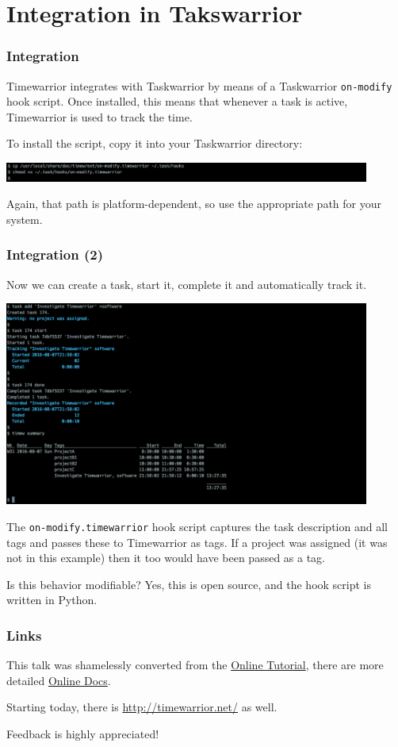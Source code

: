 \documentclass[t,handout]{beamer}
\begin{document}
\section{Integration in Takswarrior}

\begin{frame}[fragile]\frametitle{Integration}
    \vfill
    Timewarrior integrates with Taskwarrior by means of a Taskwarrior \verb=on-modify= hook script. Once installed, this means that whenever a task is active, Timewarrior is used to track the time.

    To install the script, copy it into your Taskwarrior directory:

    \includegraphics[width=12cm]{images/tutorial49.png}

    Again, that path is platform-dependent, so use the appropriate path for your system.
\end{frame}

\begin{frame}[fragile]\frametitle{Integration (2)}
    \vfill
    Now we can create a task, start it, complete it and automatically track it.

    \includegraphics[width=12cm]{images/tutorial50.png}

    The \verb=on-modify.timewarrior= hook script captures the task description and all tags and passes these to Timewarrior as tags. If a project was assigned (it was not in this example) then it too would have been passed as a tag.

    Is this behavior modifiable?  Yes, this is open source, and the hook script is written in Python.
\end{frame}

\begin{frame}[fragile]\frametitle{Links}
    \vfill
    This talk was shamelessly converted from the \href{https://taskwarrior.org/docs/timewarrior/tutorial.html}{Online Tutorial}, there are more detailed \href{https://taskwarrior.orgdocs/timewarrior/index.html}{Online Docs}.

    Starting today, there is \href{http://timewarrior.net/}{http://timewarrior.net/} as well.

    Feedback is highly appreciated!
\end{frame}
\end{document}
